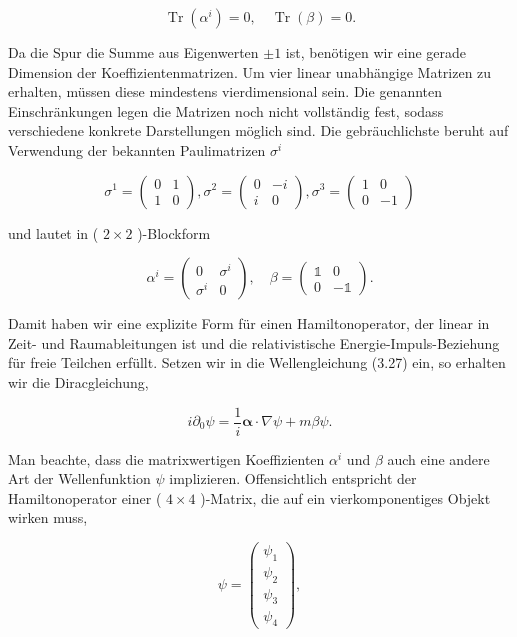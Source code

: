 \documentclass[10pt, letterpaper]{article}
\begin{document}
$$
\operatorname{Tr}\left(\alpha^{i}\right)=0, \quad \operatorname{Tr}(\beta)=0 .
$$

Da die Spur die Summe aus Eigenwerten $\pm 1$ ist, benötigen wir eine gerade Dimension der Koeffizientenmatrizen. Um vier linear unabhängige Matrizen zu erhalten, müssen diese mindestens vierdimensional sein. Die genannten Einschränkungen legen die Matrizen noch nicht vollständig fest, sodass verschiedene konkrete Darstellungen möglich sind. Die gebräuchlichste beruht auf Verwendung der bekannten Paulimatrizen $\sigma^{i}$

$$
\sigma^{1}=\left(\begin{array}{ll}
0 & 1 \\
1 & 0
\end{array}\right), \sigma^{2}=\left(\begin{array}{cc}
0 & -i \\
i & 0
\end{array}\right), \sigma^{3}=\left(\begin{array}{cc}
1 & 0 \\
0 & -1
\end{array}\right)
$$

und lautet in ( $2 \times 2$ )-Blockform

$$
\alpha^{i}=\left(\begin{array}{cc}
0 & \sigma^{i} \\
\sigma^{i} & 0
\end{array}\right), \quad \beta=\left(\begin{array}{cc}
\mathbb{1} & 0 \\
0 & -\mathbb{1}
\end{array}\right) .
$$

Damit haben wir eine explizite Form für einen Hamiltonoperator, der linear in Zeit- und Raumableitungen ist und die relativistische Energie-Impuls-Beziehung für freie Teilchen erfüllt. Setzen wir in die Wellengleichung (3.27) ein, so erhalten wir die Diracgleichung,

$$
i \partial_{0} \psi=\frac{1}{i} \boldsymbol{\alpha} \cdot \nabla \psi+m \beta \psi .
$$

Man beachte, dass die matrixwertigen Koeffizienten $\alpha^{i}$ und $\beta$ auch eine andere Art der Wellenfunktion $\psi$ implizieren. Offensichtlich entspricht der Hamiltonoperator einer ( $4 \times 4$ )-Matrix, die auf ein vierkomponentiges Objekt wirken muss,

$$
\psi=\left(\begin{array}{l}
\psi_{1} \\
\psi_{2} \\
\psi_{3} \\
\psi_{4}
\end{array}\right),
$$
\end{document}
